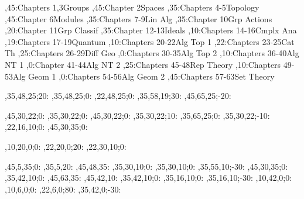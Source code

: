 
\setcounter{diagheight}{50}
\begin{chart}
,45:{Chapters 1,3}{Groups}{}
,45:{Chapter 2}{Spaces}{}
,35:{Chapters 4-5}{Topology}{}
,45:{Chapter 6}{Modules}{}
,35:{Chapters 7-9}{Lin Alg}{}
,35:{Chapter 10}{Grp Actions}{}
,20:{Chapter 11}{Grp Classif}{}
,35:{Chapter 12-13}{Ideals}{}
,10:{Chapters 14-16}{Cmplx Ana}{}
,19:{Chapters 17-19}{Quantum}{}
,10:{Chapters 20-22}{Alg Top 1}{}
,22:{Chapters 23-25}{Cat Th}{}
,25:{Chapters 26-29}{Diff Geo}{}
,0:{Chapters 30-35}{Alg Top 2}{}
,10:{Chapters 36-40}{Alg NT 1}{}
,0:{Chapter 41-44}{Alg NT 2}{}
,25:{Chapters 45-48}{Rep Theory}{}
,10:{Chapters 49-53}{Alg Geom 1}{}
,0:{Chapters 54-56}{Alg Geom 2}{}
,45:{Chapters 57-63}{Set Theory}{}

,35,48,25;20:  %
,35,48,25;0:   %
,22,48,25;0:   %
,35,58,19;30:  %
,45,65,25;-20: %

,45,30,22;0:   %
,35,30,22;0:   %
,45,30,22;0:   %
,35,30,22;10:  %
,35,65,25;0:   %
,35,30,22;-10: %
,22,16,10;0:   %
,45,30,35;0:   %

,10,20,0;0:    %
,22,20,0;20:   %
,22,30,10;0:   %

,45,5,35;0:    %
,35,5,20:      %
,45,48,35:     %
,35,30,10;0:   %
,35,30,10;0:   %
,35,55,10;-30: %
,45,30,35;0:   %
,35,42,10;0:   %
,45,63,35:     %
,45,42,10:     %
,35,42,10;0:   %
,35,16,10;0:   %
,35,16,10;-30: %
,10,42,0;0:    %
,10,6,0;0:     %
,22,6,0;80:     %
,35,42,0;-30:  %
\end{chart}
